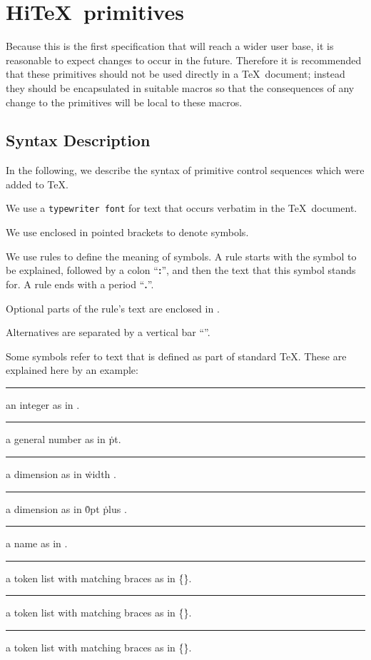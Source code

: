 \section{Hi\TeX\ primitives}

Because this is the first specification that will reach a wider user base,
it is reasonable to expect changes to occur in the future. Therefore it is
recommended that these primitives should not be used directly in a
\TeX\ document; instead they should be encapsulated in suitable
macros so that the consequences of any change to the primitives will 
be local to these macros.

\subsection{Syntax Description}
In the following, we describe the syntax of primitive control sequences which were
added to \TeX.

\itemize
\item We use a {\tt typewriter font}
for text that occurs verbatim in the \TeX\ document.
\item We use  enclosed in pointed brackets to denote symbols.
\item We use rules to define the meaning of symbols.
A rule starts with the symbol
to be explained, followed by a colon ``{\bf :}'', and then the text that this symbol
stands for. A rule ends with a period ``{\bf .}''.
\item Optional parts of the rule's text
are enclosed in .
\item Alternatives are separated by a vertical bar ``\OR''\index{\OR}.
\item Some symbols refer to text that is defined as part of standard \TeX. These are explained here by an example:

\medskip
\rule{}: 
  an integer as in  .
\rule{}: 
  a general number as in  \.{pt}.
\rule{}:
  a dimension as in  \.{width} .
\rule{}:
  a dimension as in  \.{0pt} \.{plus} .
\rule{}:
  a name as in  .
\rule{}:
  a token list  with matching braces as in
  \.{\{}\.{\}}.
\rule{}:
  a token list  with matching braces as in
  \.{\{}\.{\}}.
\rule{}:
  a token list with matching braces as in
  \.{\{}\.{\}}.
\medskip
\enditemize

